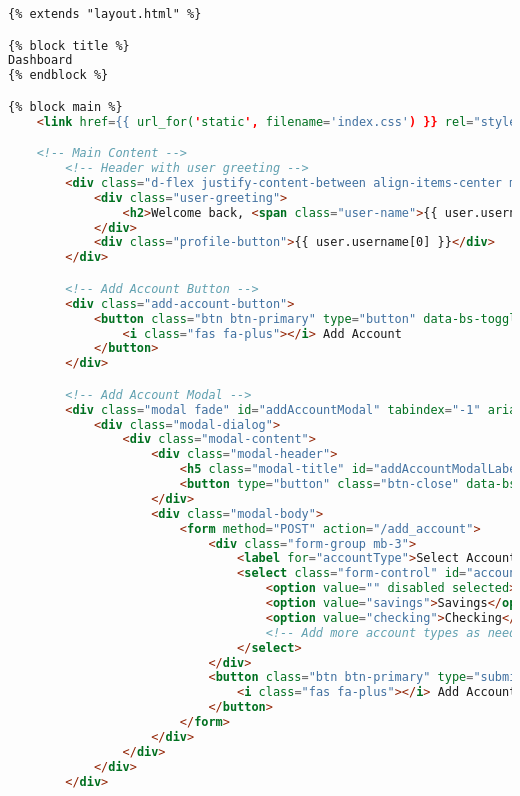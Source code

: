 \begin{lstlisting}[language=HTML]
{% extends "layout.html" %}

{% block title %}
Dashboard
{% endblock %}

{% block main %}
    <link href={{ url_for('static', filename='index.css') }} rel="stylesheet">

    <!-- Main Content -->
        <!-- Header with user greeting -->
        <div class="d-flex justify-content-between align-items-center mb-4">
            <div class="user-greeting">
                <h2>Welcome back, <span class="user-name">{{ user.username }}</span>!</h2>
            </div>
            <div class="profile-button">{{ user.username[0] }}</div>
        </div>

        <!-- Add Account Button -->
        <div class="add-account-button">
            <button class="btn btn-primary" type="button" data-bs-toggle="modal" data-bs-target="#addAccountModal">
                <i class="fas fa-plus"></i> Add Account
            </button>
        </div>

        <!-- Add Account Modal -->
        <div class="modal fade" id="addAccountModal" tabindex="-1" aria-labelledby="addAccountModalLabel" aria-hidden="true">
            <div class="modal-dialog">
                <div class="modal-content">
                    <div class="modal-header">
                        <h5 class="modal-title" id="addAccountModalLabel">Add New Account</h5>
                        <button type="button" class="btn-close" data-bs-dismiss="modal" aria-label="Close"></button>
                    </div>
                    <div class="modal-body">
                        <form method="POST" action="/add_account">
                            <div class="form-group mb-3">
                                <label for="accountType">Select Account Type</label>
                                <select class="form-control" id="accountType" name="account_type" required>
                                    <option value="" disabled selected>Select an account type</option>
                                    <option value="savings">Savings</option>
                                    <option value="checking">Checking</option>
                                    <!-- Add more account types as needed -->
                                </select>
                            </div>
                            <button class="btn btn-primary" type="submit">
                                <i class="fas fa-plus"></i> Add Account
                            </button>
                        </form>
                    </div>
                </div>
            </div>
        </div>


\end{lstlisting}
